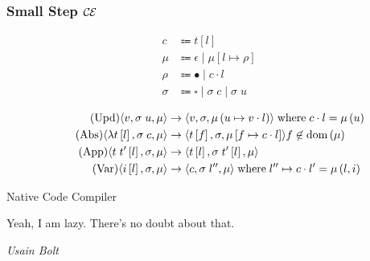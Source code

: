 \documentclass[14pt,mathserif]{beamer}
\def\ce{$\mathcal{\mathcal{C} \mskip -1mu \mathcal{E}} \mskip 4mu$}
\newcommand{\sectionslide}[3]{
  \begin{frame}
  \vspace{1cm}
  \vfill
  {\usebeamerfont{title} \color{red} #1}
  \vfill
  \epigraph{\footnotesize{#2}}{\footnotesize{\emph{#3}}}
  \end{frame}}
\begin{document}
\begin{frame}[fragile]
\frametitle{Small Step \ce}
\footnotesize
\begin{align*}
\tag{Closure} c &\Coloneqq t \left[l\right] \\
\tag{Heap} \mu &\Coloneqq \epsilon \; | \; \mu \left[ l \mapsto \rho \right] \\
\tag{Environment} \rho &\Coloneqq \bullet \; | \; c \cdot l \\
\tag{Stack} \sigma &\Coloneqq \square \; | \; \sigma \; c \;  | \; \sigma \; u \\
\end{align*}
\begin{align*}
\tag{Upd}
\langle v,  \sigma \; u , \mu \rangle 
  &\rightarrow
\langle v, \sigma, \mu\left(u \mapsto v \cdot l\right) \rangle  
\; \textnormal{where} \; c \cdot l = \mu\left(u\right) \\
\tag{Abs}
\langle \lambda t\left[l\right], \sigma \; c, \mu \rangle 
  &\rightarrow
\langle t\left[f\right], \sigma, \mu\left[f \mapsto c \cdot l\right]\rangle f
\not \in \textnormal{dom}\left(\mu\right)  \\
\tag{App}
\langle t \; t'\left[l\right], \sigma, \mu \rangle
  &\rightarrow
\langle t\left[l\right], \sigma \; t'\left[l\right], \mu \rangle \\
\tag{Var}
\langle i\left[l\right], \sigma, \mu \rangle
  &\rightarrow
\langle c, \sigma \; l'', \mu \rangle
\; \textnormal{where} \; l'' \mapsto c \cdot l' = \mu\left(l, i\right)
\end{align*}
\end{frame}

\sectionslide{Native Code Compiler}
{Yeah, I am lazy. There's no doubt about that.}
{Usain Bolt}
\end{document}
